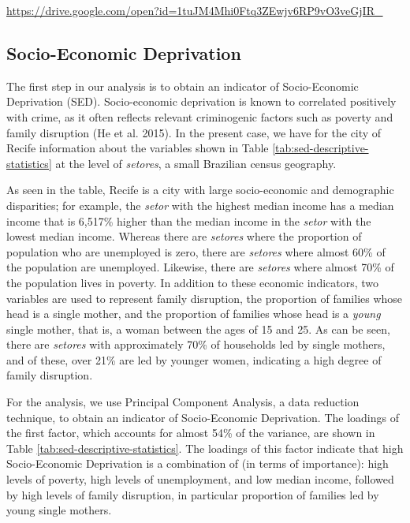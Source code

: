 \documentclass[smallextended]{svjour3}       %
\begin{document}
\url{https://drive.google.com/open?id=1tuJM4Mhi0Ftq3ZEwjv6RP9vO3veGjIR_}

\hypertarget{socio-economic-deprivation}{%
\subsection{Socio-Economic
Deprivation}\label{socio-economic-deprivation}}

The first step in our analysis is to obtain an indicator of
Socio-Economic Deprivation (SED). Socio-economic deprivation is known to
correlated positively with crime, as it often reflects relevant
criminogenic factors such as poverty and family disruption (He et al.
2015). In the present case, we have for the city of Recife information
about the variables shown in Table \ref{tab:sed-descriptive-statistics}
at the level of \emph{setores}, a small Brazilian census geography.

As seen in the table, Recife is a city with large socio-economic and
demographic disparities; for example, the \emph{setor} with the highest
median income has a median income that is 6,517\% higher than the median
income in the \emph{setor} with the lowest median income. Whereas there
are \emph{setores} where the proportion of population who are unemployed
is zero, there are \emph{setores} where almost 60\% of the population
are unemployed. Likewise, there are \emph{setores} where almost 70\% of
the population lives in poverty. In addition to these economic
indicators, two variables are used to represent family disruption, the
proportion of families whose head is a single mother, and the proportion
of families whose head is a \emph{young} single mother, that is, a woman
between the ages of 15 and 25. As can be seen, there are \emph{setores}
with approximately 70\% of households led by single mothers, and of
these, over 21\% are led by younger women, indicating a high degree of
family disruption.

For the analysis, we use Principal Component Analysis, a data reduction
technique, to obtain an indicator of Socio-Economic Deprivation. The
loadings of the first factor, which accounts for almost 54\% of the
variance, are shown in Table \ref{tab:sed-descriptive-statistics}. The
loadings of this factor indicate that high Socio-Economic Deprivation is
a combination of (in terms of importance): high levels of poverty, high
levels of unemployment, and low median income, followed by high levels
of family disruption, in particular proportion of families led by young
single mothers.
\end{document}
